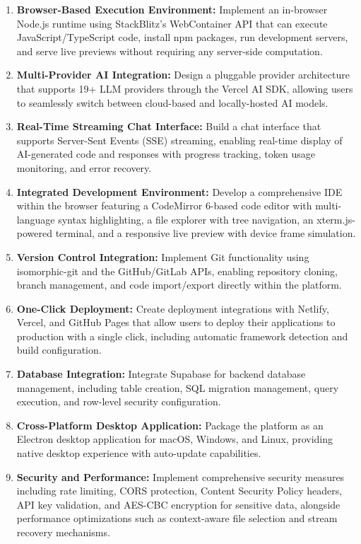 \documentclass[12pt,a4paper,openany]{report}
\begin{document}
\begin{enumerate}
    \item \textbf{Browser-Based Execution Environment:} Implement an in-browser Node.js runtime using StackBlitz's WebContainer API that can execute JavaScript/TypeScript code, install npm packages, run development servers, and serve live previews without requiring any server-side computation.

    \item \textbf{Multi-Provider AI Integration:} Design a pluggable provider architecture that supports 19+ LLM providers through the Vercel AI SDK, allowing users to seamlessly switch between cloud-based and locally-hosted AI models.

    \item \textbf{Real-Time Streaming Chat Interface:} Build a chat interface that supports Server-Sent Events (SSE) streaming, enabling real-time display of AI-generated code and responses with progress tracking, token usage monitoring, and error recovery.

    \item \textbf{Integrated Development Environment:} Develop a comprehensive IDE within the browser featuring a CodeMirror 6-based code editor with multi-language syntax highlighting, a file explorer with tree navigation, an xterm.js-powered terminal, and a responsive live preview with device frame simulation.

    \item \textbf{Version Control Integration:} Implement Git functionality using isomorphic-git and the GitHub/GitLab APIs, enabling repository cloning, branch management, and code import/export directly within the platform.

    \item \textbf{One-Click Deployment:} Create deployment integrations with Netlify, Vercel, and GitHub Pages that allow users to deploy their applications to production with a single click, including automatic framework detection and build configuration.

    \item \textbf{Database Integration:} Integrate Supabase for backend database management, including table creation, SQL migration management, query execution, and row-level security configuration.

    \item \textbf{Cross-Platform Desktop Application:} Package the platform as an Electron desktop application for macOS, Windows, and Linux, providing native desktop experience with auto-update capabilities.

    \item \textbf{Security and Performance:} Implement comprehensive security measures including rate limiting, CORS protection, Content Security Policy headers, API key validation, and AES-CBC encryption for sensitive data, alongside performance optimizations such as context-aware file selection and stream recovery mechanisms.
\end{enumerate}
\end{document}
